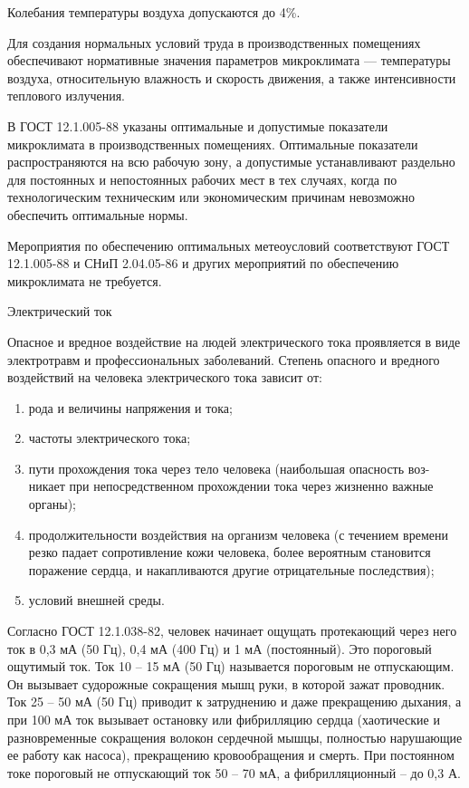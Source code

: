 Колебания температуры воздуха допускаются до 4\%.

Для создания нормальных условий труда в производственных помещениях обеспечивают нормативные значения параметров микроклимата --- температуры воздуха, относительную влажность и скорость движения, а также интенсивности теплового излучения.

В ГОСТ 12.1.005-88 указаны оптимальные и допустимые показатели микроклимата в производственных помещениях.
Оптимальные показатели распространяются на всю рабочую зону, а допустимые устанавливают раздельно для постоянных и непостоянных рабочих мест в тех случаях, когда по технологическим техническим или экономическим причинам невозможно обеспечить оптимальные нормы.

Мероприятия по обеспечению оптимальных метеоусловий соответствуют ГОСТ 12.1.005-88 и СНиП 2.04.05-86 и других мероприятий по обеспечению микроклимата не требуется.

\point Электрический ток

Опасное и вредное воздействие на людей электрического тока проявляется в виде электротравм и профессиональных заболеваний.
Степень опасного и вредного воздействий на человека электрического тока зависит от:

\begin{enumerate}
	\item рода и величины напряжения и тока; 
	\item частоты электрического тока;
	\item пути прохождения тока через тело человека (наибольшая опасность воз-никает при непосредственном прохождении тока через жизненно важные органы);
	\item продолжительности воздействия на организм человека (с течением времени резко падает сопротивление кожи человека, более вероятным становится поражение сердца, и накапливаются другие отрицательные последствия);
	\item условий внешней среды.
\end{enumerate}

Согласно ГОСТ 12.1.038-82, человек начинает ощущать протекающий через него ток в 0,3 мА (50 Гц), 0,4 мА (400 Гц) и 1 мА (постоянный).
Это пороговый ощутимый ток.
Ток 10 – 15 мА (50 Гц) называется пороговым не отпускающим.
Он вызывает судорожные сокращения мышц руки, в которой зажат проводник.
Ток 25 – 50 мА (50 Гц) приводит к затруднению и даже прекращению дыхания, а при 100 мА ток вызывает остановку или фибрилляцию сердца (хаотические и разновременные сокращения волокон сердечной мышцы, полностью нарушающие ее работу как насоса), прекращению кровообращения и смерть.
При постоянном токе пороговый не отпускающий ток 50 – 70 мА, а фибрилляционный – до 0,3 А.

